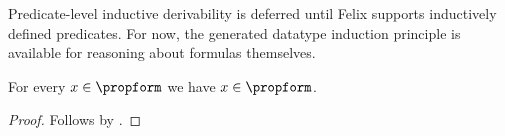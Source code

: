 Predicate-level inductive derivability is deferred until Felix supports
inductively defined predicates. For now, the generated datatype induction
principle is available for reasoning about formulas themselves.

\begin{proposition}\label{propform_induction_sanity}
    For every $x \in \propform$ we have $x \in \propform$.
\end{proposition}
\begin{proof}
    Follows by .
\end{proof}
